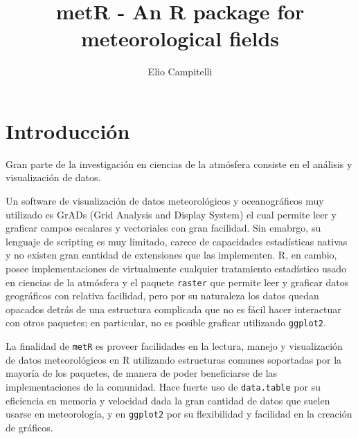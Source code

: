 \documentclass[runningheads]{llncs}
\begin{document}
\title{metR - An R package for meteorological fields}

%
\author{Elio Campitelli}

%
%
%
\maketitle              %
%
\begin{abstract}
\end{abstract}


\section{Introducción}\label{introduccion}

Gran parte de la investigación en ciencias de la atmósfera consiste en
el análisis y visualización de datos.

Un software de visualización de datos meteorológicos y oceanográficos
muy utilizado es GrADs (Grid Analysis and Display System) el cual
permite leer y graficar campos escalares y vectoriales con gran
facilidad. Sin emabrgo, su lenguaje de scripting es muy limitado, carece
de capacidades estadísticas nativas y no existen gran cantidad de
extensiones que las implementen. R, en cambio, posee implementaciones de
virtualmente cualquier tratamiento estadístico usado en ciencias de la
atmósfera y el paquete \texttt{raster} que permite leer y graficar datos
geográficos con relativa facilidad, pero por su naturaleza los datos
quedan opacados detrás de una estructura complicada que no es fácil
hacer interactuar con otros paquetes; en particular, no es posible
graficar utilizando \texttt{ggplot2}.

La finalidad de \texttt{metR} es proveer facilidades en la lectura,
manejo y visualización de datos meteorológicos en R utilizando
estructuras comunes soportadas por la mayoría de los paquetes, de manera
de poder beneficiarse de las implementaciones de la comunidad. Hace
fuerte uso de \texttt{data.table} por su eficiencia en memoria y
velocidad dada la gran cantidad de datos que suelen usarse en
meteorología, y en \texttt{ggplot2} por su flexibilidad y facilidad en
la creación de gráficos.
\end{document}
